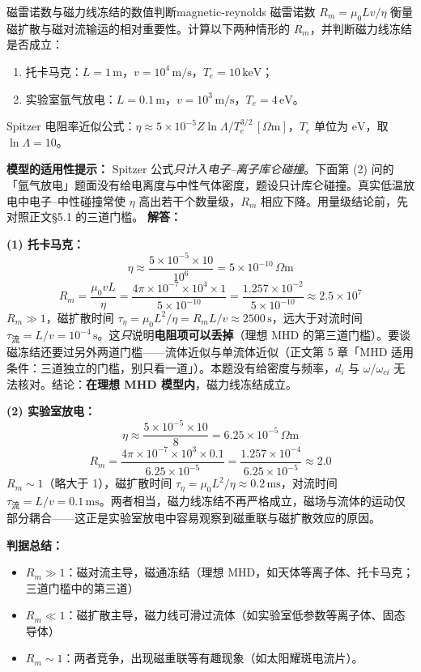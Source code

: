 \begin{example}{磁雷诺数与磁力线冻结的数值判断}{magnetic-reynolds}
磁雷诺数 $R_m = \mu_0 L v / \eta$ 衡量磁扩散与磁对流输运的相对重要性。计算以下两种情形的 $R_m$，并判断磁力线冻结是否成立：
\begin{enumerate}[label=(\arabic*)]
\item 托卡马克：$L=1\,\mathrm{m}$，$v=10^4\,\mathrm{m/s}$，$T_e=10\,\mathrm{keV}$；
\item 实验室氩气放电：$L=0.1\,\mathrm{m}$，$v=10^3\,\mathrm{m/s}$，$T_e=4\,\mathrm{eV}$。
\end{enumerate}
Spitzer 电阻率近似公式：$\eta \approx 5\times 10^{-5} Z\ln\Lambda / T_e^{3/2}\,[\Omega\mathrm{m}]$，$T_e$ 单位为 $\mathrm{eV}$，取 $\ln\Lambda=10$。

\textbf{模型的适用性提示：} Spitzer 公式\emph{只计入电子--离子库仑碰撞}。下面第 (2) 问的「氩气放电」题面没有给电离度与中性气体密度，题设只计库仑碰撞。真实低温放电中电子--中性碰撞常使 $\eta$ 高出若干个数量级，$R_m$ 相应下降。用量级结论前，先对照正文\S 5.1 的三道门槛。
\tcblower
\textbf{解答：}

\textbf{(1) 托卡马克：}
\[
\eta \approx \frac{5\times 10^{-5}\times 10}{10^6} = 5\times 10^{-10}\,\Omega\mathrm{m}
\]
\[
R_m = \frac{\mu_0 v L}{\eta} = \frac{4\pi\times 10^{-7}\times 10^4\times 1}{5\times 10^{-10}} = \frac{1.257\times 10^{-2}}{5\times 10^{-10}} \approx 2.5\times 10^7
\]
$R_m \gg 1$，磁扩散时间 $\tau_\eta = \mu_0 L^2/\eta = R_m L/v \approx 2500\,\mathrm{s}$，远大于对流时间 $\tau_{\text{流}} = L/v = 10^{-4}\,\mathrm{s}$。这\emph{只}说明\textbf{电阻项可以丢掉}（理想 MHD 的第三道门槛）。要谈磁冻结还要过另外两道门槛——流体近似与单流体近似（正文第 5 章「MHD 适用条件：三道独立的门槛，别只看一道」）。本题没有给密度与频率，$d_i$ 与 $\omega/\omega_{ci}$ 无法核对。结论：\textbf{在理想 MHD 模型内}，磁力线冻结成立。

\textbf{(2) 实验室放电：}
\[
\eta \approx \frac{5\times 10^{-5}\times 10}{8} = 6.25\times 10^{-5}\,\Omega\mathrm{m}
\]
\[
R_m = \frac{4\pi\times 10^{-7}\times 10^3\times 0.1}{6.25\times 10^{-5}} = \frac{1.257\times 10^{-4}}{6.25\times 10^{-5}} \approx 2.0
\]
$R_m \sim 1$（略大于 1），磁扩散时间 $\tau_\eta = \mu_0 L^2/\eta \approx 0.2\,\mathrm{ms}$，对流时间 $\tau_{\text{流}} = L/v = 0.1\,\mathrm{ms}$。两者相当，磁力线冻结不再严格成立，磁场与流体的运动仅部分耦合——这正是实验室放电中容易观察到磁重联与磁扩散效应的原因。

\textbf{判据总结：}
\begin{itemize}[leftmargin=*,itemsep=0pt]
\item $R_m \gg 1$：磁对流主导，磁通冻结（理想 MHD，如天体等离子体、托卡马克；三道门槛中的第三道）
\item $R_m \ll 1$：磁扩散主导，磁力线可滑过流体（如实验室低参数等离子体、固态导体）
\item $R_m \sim 1$：两者竞争，出现磁重联等有趣现象（如太阳耀斑电流片）。
\end{itemize}
\end{example}

